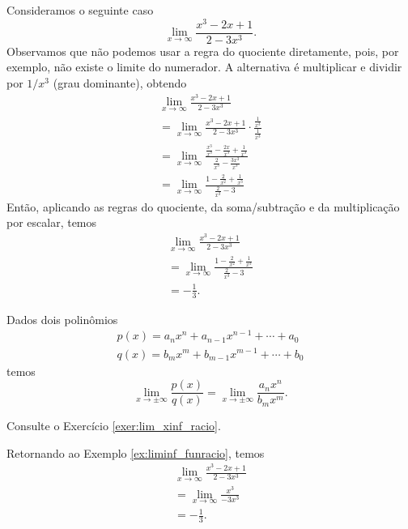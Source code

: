 \begin{ex}\label{ex:liminf_funracio}
  Consideramos o seguinte caso
  \begin{equation}
    \lim_{x\to \infty} \frac{x^3 - 2x + 1}{2 - 3x^3}.
  \end{equation}
  Observamos que não podemos usar a regra do quociente diretamente, pois, por exemplo, não existe o limite do numerador.
  A alternativa é multiplicar e dividir por $1/x^3$ (grau dominante), obtendo
  \begin{gather}
    \lim_{x\to \infty} \frac{x^3 - 2x + 1}{2 - 3x^3} \\
    = \lim_{x\to\infty} \frac{x^3 - 2x + 1}{2 - 3x^3}\cdot\frac{\frac{1}{x^3}}{\frac{1}{x^3}} \\
    = \lim_{x\to\infty} \frac{\frac{x^3}{x^3}-\frac{2x}{x^3} + \frac{1}{x^3}}{\frac{2}{x^3}-\frac{3x^3}{x^3}} \\
    = \lim_{x\to\infty} \frac{1-\frac{2}{x^2} + \frac{1}{x^3}}{\frac{2}{x^3}-3}
  \end{gather}
  Então, aplicando as regras do quociente, da soma/subtração e da multiplicação por escalar, temos
  \begin{gather}
    \lim_{x\to\infty} \frac{x^3 - 2x + 1}{2 - 3x^3} \\
    = \lim_{x\to\infty} \frac{1-\frac{2}{x^2} + \frac{1}{x^3}}{\frac{2}{x^3}-3}\\
    = -\frac{1}{3}.
  \end{gather}
\end{ex}

\begin{prop}\label{prop:lim_xinf_racio}
  Dados dois polinômios
  \begin{gather}
    p(x) = a_nx^n+a_{n-1}x^{n-1}+\cdots + a_0 \\
    q(x) = b_mx^m+b_{m-1}x^{m-1}+\cdots + b_0
\end{gather}
temos
\begin{equation}
  \lim_{x\to \pm\infty} \frac{p(x)}{q(x)} = \lim_{x\to\pm\infty}\frac{a_nx^n}{b_mx^m}.
\end{equation}
\end{prop}
\begin{dem}
  Consulte o Exercício \ref{exer:lim_xinf_racio}.
\end{dem}

\begin{ex}
  Retornando ao Exemplo \ref{ex:liminf_funracio}, temos
  \begin{gather}
    \lim_{x\to\infty} \frac{x^3 - 2x + 1}{2 - 3x^3} \\
    = \lim_{x\to\infty} \frac{x^3}{-3x^3} \\
    = -\frac{1}{3}.
  \end{gather}
\end{ex}

